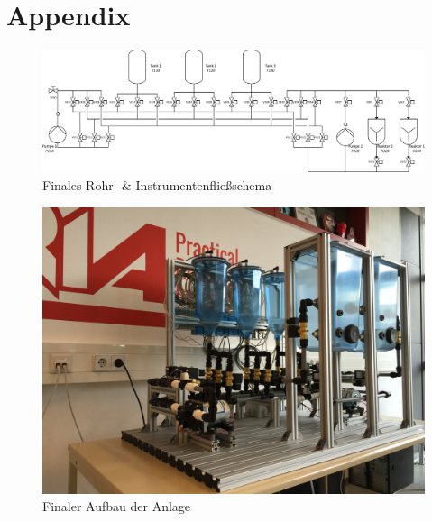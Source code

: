 \chapter{Appendix}
	
	\begin{figure}[h!]
  		\centering
      	\includegraphics[width=1\textwidth]{graphics/implementation/RI_Impl_farblos}
  		\caption{Finales Rohr- \& Instrumentenfließschema}
	\end{figure}	
	
	\begin{figure}[h!]
  		\centering
      	\includegraphics[width=1\textwidth]{graphics/implementation/FinalerAufbau2}
  		\caption{Finaler Aufbau der Anlage}
	\end{figure}	